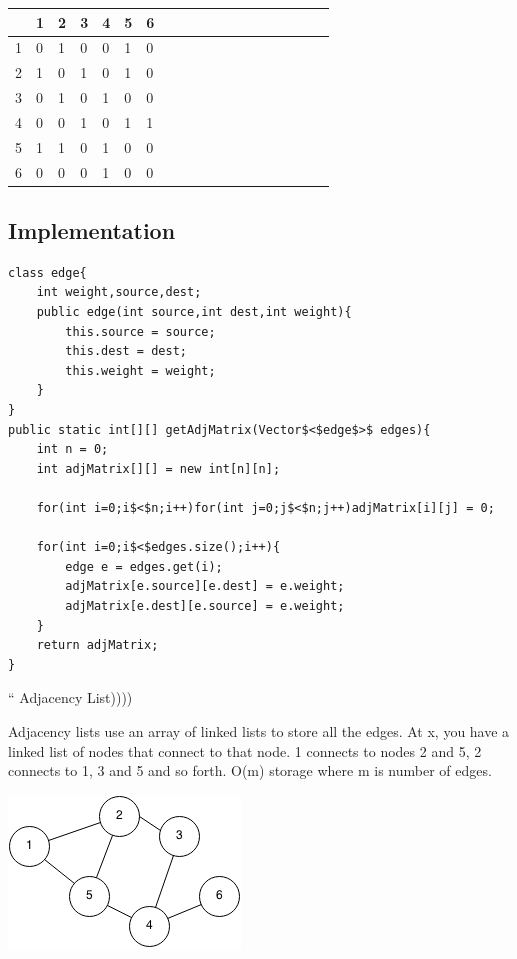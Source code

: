 \documentclass[11pt,oneside]{book}
\makeatletter
\def\maxwidth#1{\ifdim\Gin@nat@width>#1 #1\else\Gin@nat@width\fi}
\makeatother
\begin{document}
\vspace{10pt} \begin{tabulary}{0.4\linewidth}{|l|l|l|l|l|l|l|l|l|l|l|l|l|l|l|l|l|l|l}\hline


   &
  1 &
  2 &
  3 &
  4 &
  5 &
  6\\
\hline


  1 &
  0 &
  1 &
  0 &
  0 &
  1 &
  0\\

  2 &
  1 &
  0 &
  1 &
  0 &
  1 &
  0\\

  3 &
  0 &
  1 &
  0 &
  1 &
  0 &
  0\\

  4 &
  0 &
  0 &
  1 &
  0 &
  1 &
  1\\

  5 &
  1 &
  1 &
  0 &
  1 &
  0 &
  0\\

  6 &
  0 &
  0 &
  0 &
  1 &
  0 &
  0\\

\hline\end{tabulary}

\subsection{Implementation}

\begin{lstlisting}
class edge{
    int weight,source,dest;
    public edge(int source,int dest,int weight){
        this.source = source;
        this.dest = dest;
        this.weight = weight;
    }
}
public static int[][] getAdjMatrix(Vector$<$edge$>$ edges){
    int n = 0;
    int adjMatrix[][] = new int[n][n];
    
    for(int i=0;i$<$n;i++)for(int j=0;j$<$n;j++)adjMatrix[i][j] = 0;
    
    for(int i=0;i$<$edges.size();i++){
        edge e = edges.get(i);
        adjMatrix[e.source][e.dest] = e.weight;
        adjMatrix[e.dest][e.source] = e.weight;
    }
    return adjMatrix;
}
\end{lstlisting}

        `` Adjacency List))))
        

Adjacency lists use an array of linked lists to store all the edges. At x, you have a linked list of nodes that connect to 
that node. 1 connects to nodes 2 and 5, 2 connects to 1, 3 and 5 and so forth. O(m) storage where m is number of edges.

\includegraphics[width=\maxwidth{\textwidth}]{graph.png}
\end{document}
